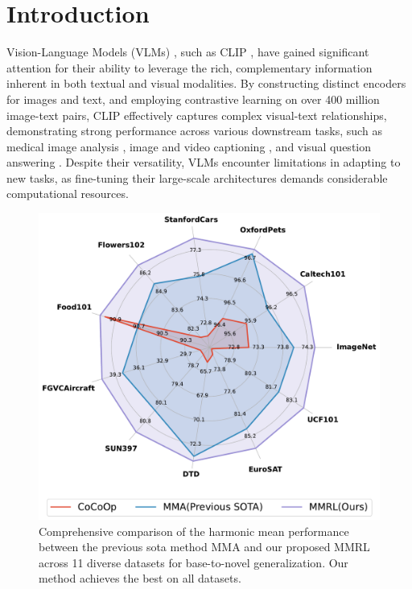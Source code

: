 \section{Introduction}
\label{sec:intro}
Vision-Language Models (VLMs) \cite{clip, align, flamingo, filip, kosmos1, kosmos2, vila}, such as CLIP \cite{clip}, have gained significant attention for their ability to leverage the rich, complementary information inherent in both textual and visual modalities. By constructing distinct encoders for images and text, and employing contrastive learning \cite{contrastive_learning} on over 400 million image-text pairs, CLIP effectively captures complex visual-text relationships, demonstrating strong performance across various downstream tasks, such as medical image analysis \cite{clip_medical1, clip_medical2, clip_medical3}, image and video captioning \cite{clip_captioning1, clip_captioning2, clip_captioning3}, and visual question answering \cite{clip_answering1, clip_answering2, clip_answering3}. Despite their versatility, VLMs encounter limitations in adapting to new tasks, as fine-tuning their large-scale architectures demands considerable computational resources.



\begin{figure}[tb]
\centering
\setlength{\abovecaptionskip}{0.2cm}   %
  \includegraphics[width=0.9\linewidth]{fig/radar.pdf}
  \caption{Comprehensive comparison of the harmonic mean performance between the previous sota method MMA and our proposed MMRL across 11 diverse datasets for base-to-novel generalization. Our method achieves the best on all datasets.}
  \label{radar}
\vspace{-0.5cm}
\end{figure}

